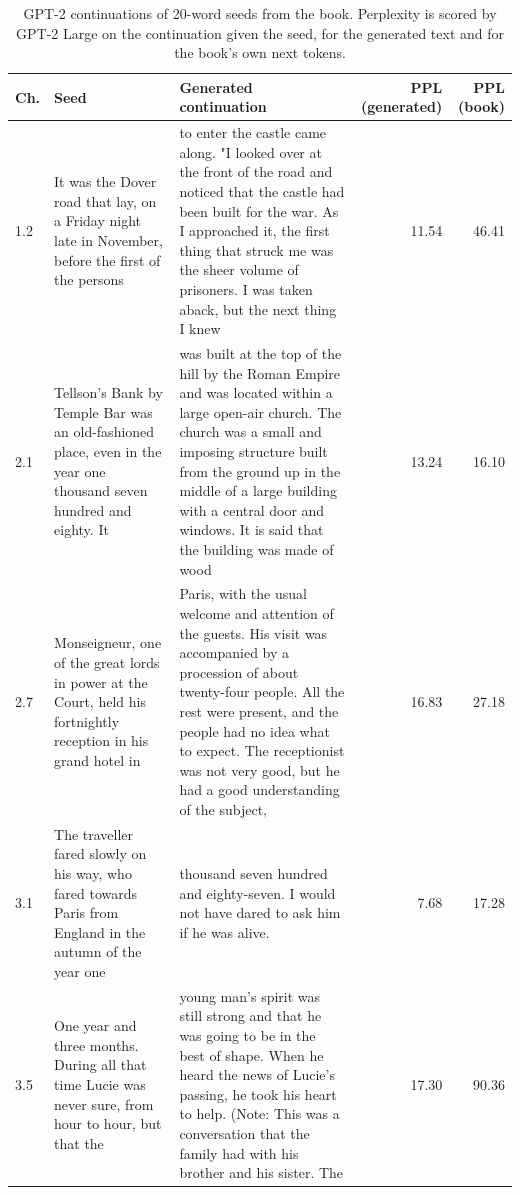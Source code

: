 \begin{table}
\caption{GPT-2 continuations of 20-word seeds from the book. Perplexity is scored by GPT-2 Large on the continuation given the seed, for the generated text and for the book's own next tokens.}
\label{tab:generation}
\begin{tabular}{l>{\raggedright\arraybackslash}p{3.6cm}>{\raggedright\arraybackslash}p{7.0cm}rr}
\toprule
Ch. & Seed & Generated continuation & PPL (generated) & PPL (book) \\
\midrule
1.2 & It was the Dover road that lay, on a Friday night late in November, before the first of the persons & to enter the castle came along. "I looked over at the front of the road and noticed that the castle had been built for the war. As I approached it, the first thing that struck me was the sheer volume of prisoners. I was taken aback, but the next thing I knew & 11.54 & 46.41 \\
2.1 & Tellson’s Bank by Temple Bar was an old-fashioned place, even in the year one thousand seven hundred and eighty. It & was built at the top of the hill by the Roman Empire and was located within a large open-air church. The church was a small and imposing structure built from the ground up in the middle of a large building with a central door and windows. It is said that the building was made of wood & 13.24 & 16.10 \\
2.7 & Monseigneur, one of the great lords in power at the Court, held his fortnightly reception in his grand hotel in & Paris, with the usual welcome and attention of the guests. His visit was accompanied by a procession of about twenty-four people. All the rest were present, and the people had no idea what to expect. The receptionist was not very good, but he had a good understanding of the subject, & 16.83 & 27.18 \\
3.1 & The traveller fared slowly on his way, who fared towards Paris from England in the autumn of the year one & thousand seven hundred and eighty-seven. I would not have dared to ask him if he was alive. & 7.68 & 17.28 \\
3.5 & One year and three months. During all that time Lucie was never sure, from hour to hour, but that the & young man's spirit was still strong and that he was going to be in the best of shape. When he heard the news of Lucie's passing, he took his heart to help. (Note: This was a conversation that the family had with his brother and his sister. The & 17.30 & 90.36 \\
\bottomrule
\end{tabular}
\end{table}

